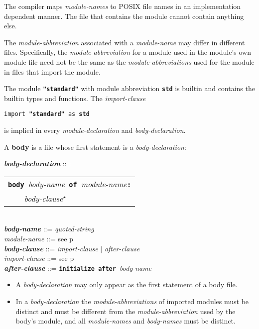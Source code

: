 \documentclass[12pt]{article}
\newcommand{\TT}[1]{{\tt \bfseries #1}}
\newcommand{\STAR}{{\Large $^\star$}}
\newcommand{\key}[1]{{\rm \bfseries #1}}
\newcommand{\ttkey}[1]{{\tt \bfseries #1}}
\newcommand{\emkey}[1]{{\em \bfseries #1}}
\newcommand{\pagref}[1]{p\pageref{#1}}
\newenvironment{indpar}[1][0.3in]%
	{\begin{list}{}%
		     {\setlength{\itemsep}{0in}%
		      \setlength{\topsep}{0in}%
		      \setlength{\parsep}{1ex}%
		      \setlength{\labelwidth}{#1}%
		      \setlength{\leftmargin}{#1}%
		      \addtolength{\leftmargin}{\labelsep}}%
	 \item}%
	{\end{list}}
\begin{document}
The compiler maps {\em module-names} to POSIX file names in an
implementation dependent manner.  The file that contains the
module cannot contain anything else.

The {\em module-abbreviation} associated with a {\em module-name}
may differ in different files.  Specifically, the {\em module-abbreviation}
for a module used in the module's own module file need not be the same
as the {\em module-abbreviations} used for the module in files
that import the module.

The module \TT{"standard"}\index{standard@\TT{"standard"}} with
module abbreviation \ttkey{std} is builtin and contains the builtin types and
functions.  The {\em import-clause}
\begin{center}
{\tt import }\TT{"standard"}{\tt{} as \ttkey{std}}
\end{center}
is implied in every {\em module-declaration} and
{\em body-declaration}.

A \key{body} is a file whose first statement is a {\em body-declaration}:

\begin{indpar}
\emkey{body-declaration}\label{BODY-DECLARATION} ::=
    \begin{tabular}[t]{l}
    \TT{body }{\em body-name}\TT{ of }{\em module-name}\TT{:} \\
    \TT{~~~~}{\em body-clause}\STAR{} \\
    \end{tabular}
\\[0.5ex]
\emkey{body-name} ::= {\em quoted-string}
\\[0.5ex]
{\em module-name} ::= see \pagref{MODULE-NAME}
\\[0.5ex]
\emkey{body-clause} ::= {\em import-clause} $|$ {\em after-clause}
\\[0.5ex]
{\em import-clause} ::= see \pagref{IMPORT-CLAUSE}
\\[0.5ex]
\emkey{after-clause} ::= \ttkey{initialize after }{\em body-name}

\begin{itemize}

\item
A {\em body-declaration} may only appear as the first statement
of a body file.

\item
In a {\em body-declaration} the {\em module-abbreviations} of imported
modules must be distinct and must be different from the
{\em module-abbreviation} used by the body's module,
and all {\em module-names} and {\em body-names} must be distinct.
\end{itemize}

\end{indpar}
\end{document}

